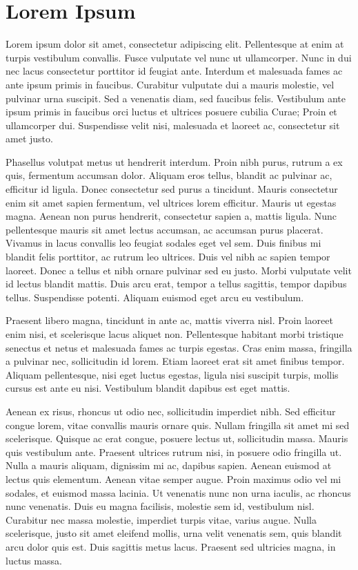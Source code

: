 \section{Lorem Ipsum}
Lorem ipsum dolor sit amet, consectetur adipiscing elit. Pellentesque at enim at turpis vestibulum convallis. Fusce vulputate vel nunc ut ullamcorper. Nunc in dui nec lacus consectetur porttitor id feugiat ante. Interdum et malesuada fames ac ante ipsum primis in faucibus. Curabitur vulputate dui a mauris molestie, vel pulvinar urna suscipit. Sed a venenatis diam, sed faucibus felis. Vestibulum ante ipsum primis in faucibus orci luctus et ultrices posuere cubilia Curae; Proin et ullamcorper dui. Suspendisse velit nisi, malesuada et laoreet ac, consectetur sit amet justo.

Phasellus volutpat metus ut hendrerit interdum. Proin nibh purus, rutrum a ex quis, fermentum accumsan dolor. Aliquam eros tellus, blandit ac pulvinar ac, efficitur id ligula. Donec consectetur sed purus a tincidunt. Mauris consectetur enim sit amet sapien fermentum, vel ultrices lorem efficitur. Mauris ut egestas magna. Aenean non purus hendrerit, consectetur sapien a, mattis ligula. Nunc pellentesque mauris sit amet lectus accumsan, ac accumsan purus placerat. Vivamus in lacus convallis leo feugiat sodales eget vel sem. Duis finibus mi blandit felis porttitor, ac rutrum leo ultrices. Duis vel nibh ac sapien tempor laoreet. Donec a tellus et nibh ornare pulvinar sed eu justo. Morbi vulputate velit id lectus blandit mattis. Duis arcu erat, tempor a tellus sagittis, tempor dapibus tellus. Suspendisse potenti. Aliquam euismod eget arcu eu vestibulum.

Praesent libero magna, tincidunt in ante ac, mattis viverra nisl. Proin laoreet enim nisi, et scelerisque lacus aliquet non. Pellentesque habitant morbi tristique senectus et netus et malesuada fames ac turpis egestas. Cras enim massa, fringilla a pulvinar nec, sollicitudin id lorem. Etiam laoreet erat sit amet finibus tempor. Aliquam pellentesque, nisi eget luctus egestas, ligula nisi suscipit turpis, mollis cursus est ante eu nisi. Vestibulum blandit dapibus est eget mattis.

Aenean ex risus, rhoncus ut odio nec, sollicitudin imperdiet nibh. Sed efficitur congue lorem, vitae convallis mauris ornare quis. Nullam fringilla sit amet mi sed scelerisque. Quisque ac erat congue, posuere lectus ut, sollicitudin massa. Mauris quis vestibulum ante. Praesent ultrices rutrum nisi, in posuere odio fringilla ut. Nulla a mauris aliquam, dignissim mi ac, dapibus sapien. Aenean euismod at lectus quis elementum. Aenean vitae semper augue. Proin maximus odio vel mi sodales, et euismod massa lacinia. Ut venenatis nunc non urna iaculis, ac rhoncus nunc venenatis. Duis eu magna facilisis, molestie sem id, vestibulum nisl. Curabitur nec massa molestie, imperdiet turpis vitae, varius augue. Nulla scelerisque, justo sit amet eleifend mollis, urna velit venenatis sem, quis blandit arcu dolor quis est. Duis sagittis metus lacus. Praesent sed ultricies magna, in luctus massa.

